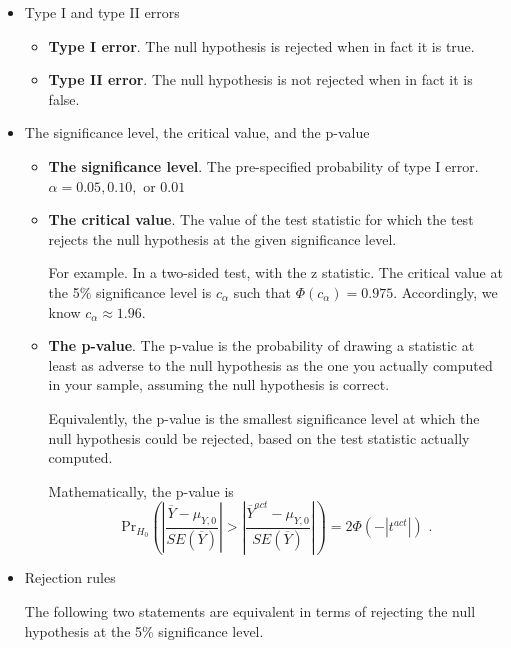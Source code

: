 \documentclass[a4paper,11pt]{article}
\newcommand{\pr}{\mathrm{Pr}}
\begin{document}
\begin{itemize}
\item Type I and type II errors
\label{sec:org27d15c7}

\begin{itemize}
\item \textbf{Type I error}. The null hypothesis is rejected when in fact it is
true.
\item \textbf{Type II error}. The null hypothesis is not rejected when in fact it
is false.
\end{itemize}

\item The significance level, the critical value, and the p-value
\label{sec:org545fa5b}

\begin{itemize}
\item \textbf{The significance level}. The pre-specified probability of type I
error.  \(\alpha = 0.05, 0.10, \text{ or } 0.01\)

\item \textbf{The critical value}. The value of the test statistic for which the
test rejects the null hypothesis at the given significance level.

For example. In a two-sided test, with the z statistic. The critical
value at the 5\% significance level is \(c_{\alpha}\) such that
\(\varPhi(c_{\alpha}) = 0.975\). Accordingly, we know \(c_{\alpha}
  \approx 1.96\).

\item \textbf{The p-value}. The p-value is the probability of drawing a statistic
at least as adverse to the null hypothesis as the one you actually
computed in your sample, assuming the null hypothesis is
correct. 

Equivalently, the p-value is the smallest significance
level at which the null hypothesis could be rejected, based on the
test statistic actually computed. 

Mathematically, the p-value is 
\[  \pr_{H_0}\left( \left| \frac{\overline{Y} - \mu_{Y,0}}{SE(\overline{Y})}
  \right| > \left| \frac{\overline{Y}^{act} - \mu_{Y,0}}{SE(\overline{Y})} \right| \right) =
  2\varPhi(-|t^{act}|) \text{ .} \]
\end{itemize}

\item Rejection rules
\label{sec:org030d7f6}

The following two statements are equivalent in terms of rejecting the
null hypothesis at the 5\% significance level. 


\end{itemize}
\end{document}
